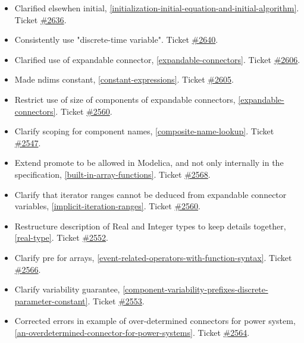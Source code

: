 \begin{itemize}
\item Clarified elsewhen initial, \cref{initialization-initial-equation-and-initial-algorithm}.
Ticket \href{https://github.com/modelica/ModelicaSpecification/issues/2636}{\#2636}.
\item Consistently use "discrete-time variable".
Ticket \href{https://github.com/modelica/ModelicaSpecification/issues/2640}{\#2640}.
\item Clarified use of expandable connector, \cref{expandable-connectors}.
Ticket \href{https://github.com/modelica/ModelicaSpecification/pull/2606}{\#2606}.
\item Made ndims constant, \cref{constant-expressions}.
Ticket \href{https://github.com/modelica/ModelicaSpecification/issues/2605}{\#2605}.
\item Restrict use of size of components of expandable connectors, \cref{expandable-connectors}.
Ticket \href{https://github.com/modelica/ModelicaSpecification/issues/2560}{\#2560}.
\item Clarify scoping for component names, \cref{composite-name-lookup}.
Ticket \href{https://github.com/modelica/ModelicaSpecification/issues/2547}{\#2547}.
\item Extend promote to be allowed in Modelica, and not only internally in the specification, \cref{built-in-array-functions}.
Ticket \href{https://github.com/modelica/ModelicaSpecification/issues/2568}{\#2568}.
\item Clarify that iterator ranges cannot be deduced from expandable connector variables, \cref{implicit-iteration-ranges}.
Ticket \href{https://github.com/modelica/ModelicaSpecification/issues/2560}{\#2560}.
\item Restructure description of Real and Integer types to keep details together, \cref{real-type}.
Ticket \href{https://github.com/modelica/ModelicaSpecification/issues/2552}{\#2552}.
\item Clarify pre for arrays, \cref{event-related-operators-with-function-syntax}.
Ticket \href{https://github.com/modelica/ModelicaSpecification/issues/2556}{\#2566}.
\item Clarify variability guarantee, \cref{component-variability-prefixes-discrete-parameter-constant}.
Ticket \href{https://github.com/modelica/ModelicaSpecification/issues/2553}{\#2553}.
\item Corrected errors in example of over-determined connectors for power system, \cref{an-overdetermined-connector-for-power-systems}.
Ticket \href{https://github.com/modelica/ModelicaSpecification/issues/2564}{\#2564}.

\end{itemize}
